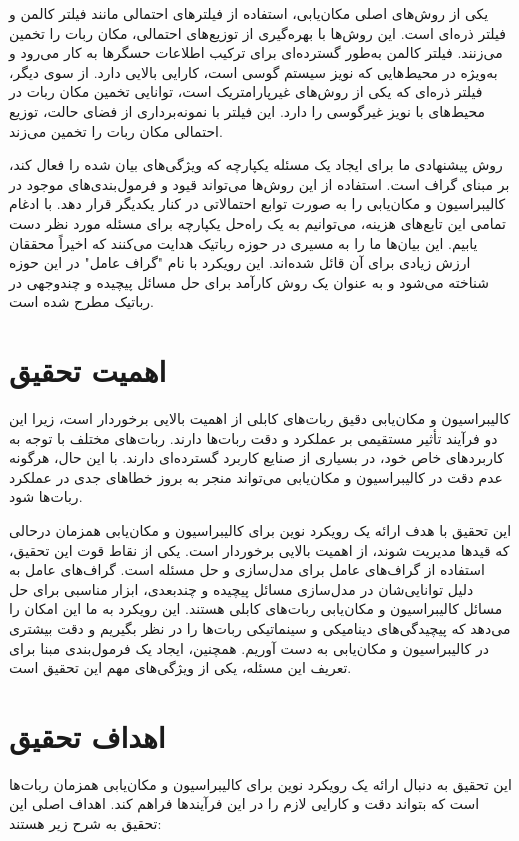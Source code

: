 یکی از روش‌های اصلی مکان‌یابی، استفاده از فیلترهای احتمالی مانند فیلتر کالمن و فیلتر ذره‌ای است. این روش‌ها با بهره‌گیری از توزیع‌های احتمالی، مکان ربات را تخمین می‌زنند. فیلتر کالمن به‌طور گسترده‌ای برای ترکیب اطلاعات حسگرها به کار می‌رود و به‌ویژه در محیط‌هایی که نویز سیستم گوسی است، کارایی بالایی دارد. از سوی دیگر، فیلتر ذره‌ای که یکی از روش‌های غیرپارامتریک است، توانایی تخمین مکان ربات در محیط‌های با نویز غیرگوسی را دارد. این فیلتر با نمونه‌برداری از فضای حالت، توزیع احتمالی مکان ربات را تخمین می‌زند.

روش پیشنهادی ما برای ایجاد یک مسئله یکپارچه که ویژگی‌های بیان شده را فعال کند، بر مبنای گراف است. استفاده از این روش‌ها می‌تواند قیود و فرمول‌بندی‌های موجود در کالیبراسیون و مکان‌یابی را به صورت توابع احتمالاتی در کنار یکدیگر قرار دهد. با ادغام تمامی این تابع‌های هزینه، می‌توانیم به یک راه‌حل یکپارچه برای مسئله مورد نظر دست یابیم. این بیان‌ها ما را به مسیری در حوزه رباتیک هدایت می‌کنند که اخیراً محققان ارزش زیادی برای آن قائل شده‌اند. این رویکرد با نام "گراف عامل" در این حوزه شناخته می‌شود و به عنوان یک روش کارآمد برای حل مسائل پیچیده و چندوجهی در رباتیک مطرح شده است.

\section{اهمیت تحقیق}

کالیبراسیون و مکان‌یابی دقیق ربات‌های کابلی از اهمیت بالایی برخوردار است، زیرا این دو فرآیند تأثیر مستقیمی بر عملکرد و دقت ربات‌ها دارند. ربات‌های مختلف با توجه به کاربردهای خاص خود، در بسیاری از صنایع کاربرد گسترده‌ای دارند. با این حال، هرگونه عدم دقت در کالیبراسیون و مکان‌یابی می‌تواند منجر به بروز خطاهای جدی در عملکرد ربات‌ها شود.

این تحقیق با هدف ارائه یک رویکرد نوین برای کالیبراسیون و مکان‌یابی همزمان درحالی که قیدها مدیریت شوند، از اهمیت بالایی برخوردار است. یکی از نقاط قوت این تحقیق، استفاده از گراف‌های عامل برای مدل‌سازی و حل مسئله است. گراف‌های عامل به دلیل توانایی‌شان در مدل‌سازی مسائل پیچیده و چندبعدی، ابزار مناسبی برای حل مسائل کالیبراسیون و مکان‌یابی ربات‌های کابلی هستند. این رویکرد به ما این امکان را می‌دهد که پیچیدگی‌های دینامیکی و سینماتیکی ربات‌ها را در نظر بگیریم و دقت بیشتری در کالیبراسیون و مکان‌یابی به دست آوریم. همچنین، ایجاد یک فرمول‌بندی مبنا برای تعریف این مسئله، یکی از ویژگی‌های مهم این تحقیق است. 


\section{اهداف تحقیق}
این تحقیق به دنبال ارائه یک رویکرد نوین برای کالیبراسیون و مکان‌یابی همزمان ربات‌ها است که بتواند دقت و کارایی لازم را در این فرآیندها فراهم کند. اهداف اصلی این تحقیق به شرح زیر هستند:


